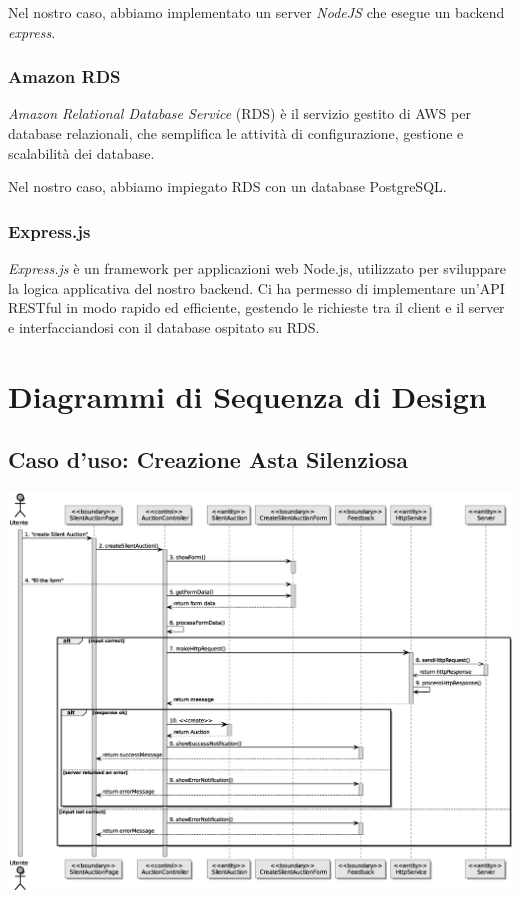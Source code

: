 Nel nostro caso, abbiamo implementato un server \textit{NodeJS} che esegue un backend \textit{express}.

\subsubsection{Amazon RDS}
\textit{Amazon Relational Database Service} (RDS) è il servizio gestito di AWS per database relazionali, che semplifica le attività di configurazione, gestione e scalabilità dei database. 

Nel nostro caso, abbiamo impiegato RDS con un database PostgreSQL.

\subsubsection{Express.js}
\textit{Express.js} è un framework per applicazioni web Node.js, utilizzato per sviluppare la logica applicativa del nostro backend. Ci ha permesso di implementare un'API RESTful in modo rapido ed efficiente, gestendo le richieste tra il client e il server e interfacciandosi con il database ospitato su RDS.

\section{Diagrammi di Sequenza di Design}
\subsection{Caso d'uso: Creazione Asta Silenziosa}
\includegraphics[width=\textwidth]{assets/sequence/creazione_asta_silenziosa.eps}

